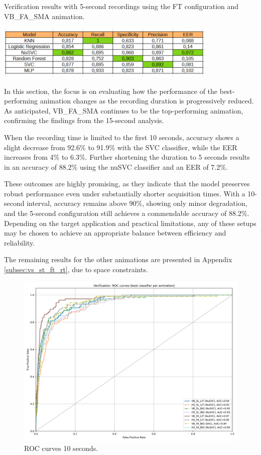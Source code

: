 \documentclass[12pt]{report}
\begin{document}
\begin{table}[ht]
    \centering
    \caption{Verification results with 5-second recordings using the FT configuration and VB\_FA\_SMA animation.}
    \includegraphics[width=0.8\textwidth]{Images/Results/Verification_single_five_ten/ft/five/VB_FA_LIT.png}
    \label{tab:VB_FA_LIT_5_ft}
\end{table}


In this section, the focus is on evaluating how the performance of the best-performing animation changes as the recording duration is progressively reduced. 
As anticipated, VB\_FA\_SMA continues to be the top-performing animation, confirming the findings from the 15-second analysis.

When the recording time is limited to the first 10 seconds, accuracy shows a slight decrease from 92.6\% to 91.9\% with the SVC classifier, while the EER increases from 4\% to 6.3\%. 
Further shortening the duration to 5 seconds results in an accuracy of 88.2\% using the nuSVC classifier and an EER of 7.2\%.

These outcomes are highly promising, as they indicate that the model preserves robust performance even under substantially shorter acquisition times. 
With a 10-second interval, accuracy remains above 90\%, showing only minor degradation, and the 5-second configuration still achieves a commendable accuracy of 88.2\%.
Depending on the target application and practical limitations, any of these setups may be chosen to achieve an appropriate balance between efficiency and reliability.

The remaining results for the other animations are presented in Appendix \ref{subsec:vs_st_ft_rt}, due to space constraints.

\begin{figure}[ht]
    \centering
    \includegraphics[width = 0.6
    \textwidth]{Images/Results/Verification_single_five_ten/ft/ten/best_animation_roc_curves_ten_ft.png}
    \caption{ROC curves 10 seconds.}
    \label{fig:roc_t_ft}
\end{figure}
\end{document}

